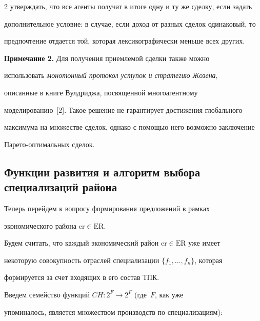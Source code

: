 \begin{multicols}{2}
утверждать, что все агенты получат в итоге одну и ту же сделку, если задать 


дополнительное условие: в случае, если доход от разных сделок одинаковый, то 


предпочтение отдается той, которая лексикографически меньше всех других.


\smallskip





\noindent


\textbf{Примечание 2.} Для получения приемлемой сделки также можно 


использовать \textit{монотонный протокол уступок и стратегию Жозена}, 


описанные в книге Вулдриджа, посвященной многоагентному 


моделированию~[2]. Такое решение не гарантирует достижения глобального 


максимума на множестве сделок, однако с помощью него возможно заключение 


Па\-ре\-то-оп\-ти\-маль\-ных сделок.





\subsection{Функции развития и алгоритм выбора специализаций района}





  Теперь перейдем к вопросу формирования предложений в рамках 


экономического района $\mathrm{er}\in \mathrm{ER}$.


  


  Будем считать, что каждый экономический район $\mathrm{er}\in \mathrm{ER}$ уже имеет 


некоторую совокупность отраслей специализации $\{f_1, \ldots , f_n\}$, которая 


формируется за счет входящих в его состав ТПК.


  


  Введем семейство функций $CH: 2^F\rightarrow 2^F$ (где~$F$, как уже 


упоминалось, является множеством производств по специализациям):


  \begin{enumerate}[1)]



\end{enumerate}
\end{multicols}
